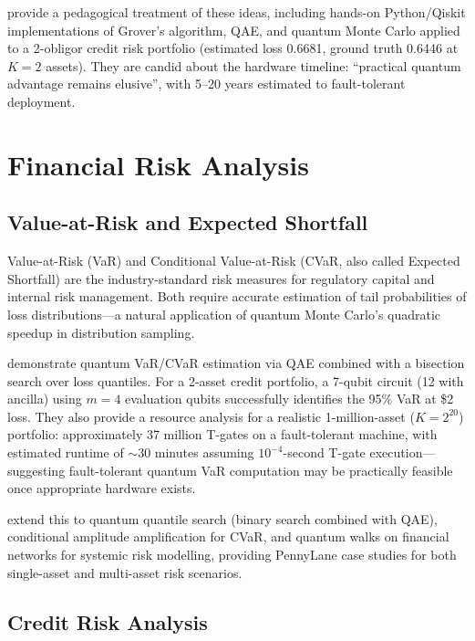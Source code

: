 \documentclass[12pt,a4paper]{article}
\begin{document}
\citet{blanchet_connecting_2025} provide a pedagogical treatment of these ideas, including hands-on Python/Qiskit implementations of Grover's algorithm, QAE, and quantum Monte Carlo applied to a 2-obligor credit risk portfolio (estimated loss 0.6681, ground truth 0.6446 at $K=2$ assets). They are candid about the hardware timeline: ``practical quantum advantage remains elusive'', with 5--20 years estimated to fault-tolerant deployment.

\section{Financial Risk Analysis}
\label{sec:risk}

\subsection{Value-at-Risk and Expected Shortfall}

Value-at-Risk (VaR) and Conditional Value-at-Risk (CVaR, also called Expected Shortfall) are the industry-standard risk measures for regulatory capital and internal risk management. Both require accurate estimation of tail probabilities of loss distributions---a natural application of quantum Monte Carlo's quadratic speedup in distribution sampling.

\citet{egger_quantum_2020} demonstrate quantum VaR/CVaR estimation via QAE combined with a bisection search over loss quantiles. For a 2-asset credit portfolio, a 7-qubit circuit (12 with ancilla) using $m=4$ evaluation qubits successfully identifies the 95\% VaR at \$2 loss. They also provide a resource analysis for a realistic 1-million-asset ($K=2^{20}$) portfolio: approximately 37 million T-gates on a fault-tolerant machine, with estimated runtime of $\sim$30 minutes assuming $10^{-4}$-second T-gate execution---suggesting fault-tolerant quantum VaR computation may be practically feasible once appropriate hardware exists.

\citet{gong_quantum_2026-1} extend this to quantum quantile search (binary search combined with QAE), conditional amplitude amplification for CVaR, and quantum walks on financial networks for systemic risk modelling, providing PennyLane case studies for both single-asset and multi-asset risk scenarios.

\subsection{Credit Risk Analysis}
\end{document}
